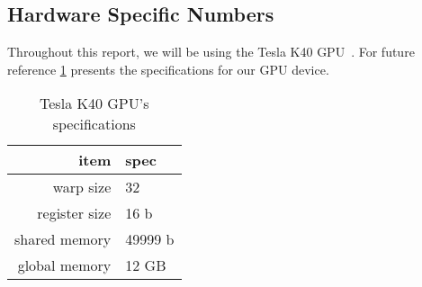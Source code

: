 \subsection{Hardware Specific Numbers}
\label{sec:hardware specific numbers}

Throughout this report, we will be using the Tesla K40 GPU~\cite{teslak402013nvidia}.
For future reference \cref{tab:tesla k40 specs} presents the specifications for our GPU device.

\begin{table}[htb]
  \centering
  \begin{tabular}{r l}
    \toprule
    item & spec \\
    \midrule
    warp size & 32 \\
    register size & 16 b \\
    shared memory & 49999 b \\
    global memory & 12 GB \\
    \bottomrule
  \end{tabular}
  \caption{Tesla K40 GPU's specifications}
  \label{tab:tesla k40 specs}
\end{table}

